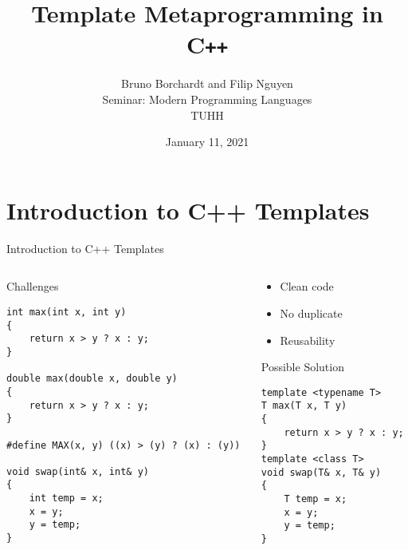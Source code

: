 \documentclass[aspectratio=169]{beamer}
\title{Template Metaprogramming in C\texttt{++}}
\author{Bruno Borchardt and Filip Nguyen
\small
\texorpdfstring{\\Seminar: Modern Programming Languages\\TUHH}{}}
\date{January 11, 2021}
\begin{document}

\begin{frame}
\titlepage 
\end{frame}


\section{Introduction to C++ Templates}

\begin{frame}[fragile]{Introduction to C++ Templates}

    \begin{columns}[t] 
        
        \begin{column}{0.5\textwidth}
        
            \scriptsize
            \begin{block}{Challenges}
                \begin{verbatim}
int max(int x, int y)
{
    return x > y ? x : y;
}

double max(double x, double y)
{
    return x > y ? x : y;
}

#define MAX(x, y) ((x) > (y) ? (x) : (y))

void swap(int& x, int& y)
{
    int temp = x;
    x = y;
    y = temp;
}
                \end{verbatim}
            \end{block}
        \end{column}
    
        \begin{column}{0.5\textwidth}
        
            \begin{itemize}
                \item Clean code
                \item No duplicate
                \item Reusability
            \end{itemize}
        
            \scriptsize
            \begin{block}{Possible Solution}
                \begin{verbatim}
template <typename T>
T max(T x, T y)
{
    return x > y ? x : y;
}
template <class T>
void swap(T& x, T& y)
{
    T temp = x;
    x = y;
    y = temp;
}
                \end{verbatim}
            \end{block}
        \end{column}
        
    \end{columns}
    
\end{frame}
\end{document}
